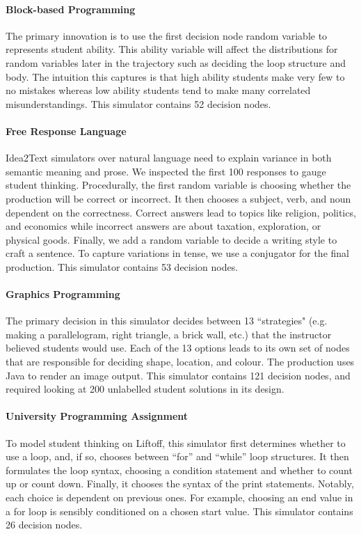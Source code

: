 \paragraph{Block-based Programming}  The primary innovation is to use the first decision node random variable to represents student ability. This ability variable will affect the distributions for random variables later in the trajectory such as deciding the loop structure and body. The intuition this captures is that high ability students make very few to no mistakes whereas low ability students tend to make many correlated misunderstandings. This simulator contains 52 decision nodes.

\paragraph{Free Response Language}  Idea2Text simulators over natural language need to explain variance in both semantic meaning and prose. We inspected the first 100 responses to gauge student thinking. Procedurally, the first random variable is choosing whether the production will be correct or incorrect. It then chooses a subject, verb, and noun dependent on the correctness. Correct answers lead to topics like religion, politics, and economics while incorrect answers are about taxation, exploration, or physical goods. Finally, we add a random variable to decide a writing style to craft a sentence. To capture variations in tense, we use a conjugator \cite{mlconjug} for the final production. This simulator contains 53 decision nodes. 
    
\paragraph{Graphics Programming}  The primary decision in this simulator decides between 13 ``strategies" (e.g. making a parallelogram, right triangle, a brick wall, etc.) that the instructor believed students would use. Each of the 13 options leads to its own set of nodes that are responsible for deciding shape, location, and colour. The production uses Java to render an image output. This simulator contains 121 decision nodes, and required looking at 200 unlabelled student solutions in its design. 
    
\paragraph{University Programming Assignment}  To model student thinking on Liftoff, this simulator first determines whether to use a loop, and, if so, chooses between ``for'' and ``while'' loop structures. It then formulates the loop syntax, choosing a condition statement and whether to count up or count down. Finally, it chooses the syntax of the print statements. Notably, each choice is dependent on previous ones. For example, choosing an end value in a for loop is sensibly conditioned on a chosen start value.  This simulator contains 26 decision nodes. 

